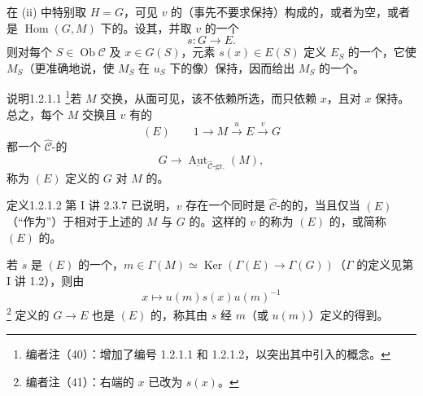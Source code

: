 在 (ii) 中特别取 $H=G$，可见 $v$ 的（事先不要求保持）构成的，或者为空，或者是 $\operatorname{Hom}(G,M)$ 下的。设其，并取 $v$ 的一个
\[
 s:G\longrightarrow E.
\]
则对每个 $S\in\operatorname{Ob}\mathcal C$ 及 $x\in G(S)$，元素 $s(x)\in E(S)$ 定义 $E_S$ 的一个，它使 $M_S$（更准确地说，使 $M_S$ 在 $u_S$ 下的像）保持，因而给出 $M_S$ 的一个。
\begin{SGAresult}{说明}{1.2.1.1}
\footnote{编者注（40）：增加了编号 1.2.1.1 和 1.2.1.2，以突出其中引入的概念。}若 $M$ 交换，从面可见，该不依赖所选，而只依赖 $x$，且对 $x$ 保持。总之，每个 $M$ 交换且 $v$ 有的
\[
 (E)\qquad 1\longrightarrow M\xrightarrow{u}E\xrightarrow{v}G
\]
都一个 $\widehat{\mathcal C}$-的
\[
 G\longrightarrow\underline{\operatorname{Aut}}_{\widehat{\mathcal C}\text{-gr.}}(M),
\]
称为 $(E)$ 定义的 $G$ 对 $M$ 的。
\end{SGAresult}
\begin{SGAresult}{定义}{1.2.1.2}
第 I 讲 2.3.7 已说明，$v$ 存在一个同时是 $\widehat{\mathcal C}$-的的，当且仅当 $(E)$（“作为”）于相对于上述的 $M$ 与 $G$ 的。这样的 $v$ 的称为 $(E)$ 的，或简称 $(E)$ 的。
\end{SGAresult}
若 $s$ 是 $(E)$ 的一个，$m\in\Gamma(M)\simeq\operatorname{Ker}(\Gamma(E)\to\Gamma(G))$（$\Gamma$ 的定义见第 I 讲 1.2），则由
\[
 x\longmapsto u(m)s(x)u(m)^{-1}
\]\footnote{编者注（41）：右端的 $x$ 已改为 $s(x)$。}
定义的 $G\to E$ 也是 $(E)$ 的，称其由 $s$ 经 $m$（或 $u(m)$）定义的得到。
